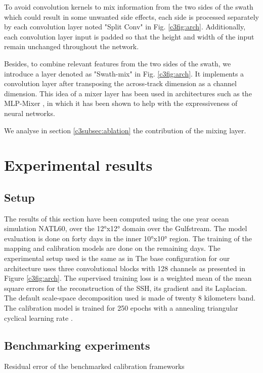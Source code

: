 \begin{bibunit}
To avoid convolution kernels to mix information from the two sides of the swath which could result in some unwanted side effects, each side is processed separately by each convolution layer noted "Split Conv" in Fig. \ref{c3fig:arch}. Additionally, each convolution layer input is padded so that the height and width of the input remain unchanged throughout the network.

Besides, to combine relevant features from the two sides of the swath, we introduce a layer denoted as "Swath-mix" in Fig. \ref{c3fig:arch}. It implements a convolution layer after transposing the across-track dimension as a channel dimension. This idea of a mixer layer has been used in architectures such as the MLP-Mixer \cite{mlpmixer}, in which it has been shown to help with the expressiveness of neural networks.


We analyse in section \ref{c3subsec:ablation} the contribution of the mixing layer.

\section{Experimental results}
\label{c3sec:results}

\subsection*{Setup}
\noindent
The results of this section have been computed using the one year ocean simulation NATL60, over the 12°x12° domain over the Gulfstream. The model evaluation is done on forty days in the inner 10°x10° region. The training of the mapping and calibration models are done on the remaining days.
The experimental setup used is the same as in \cite{osse_data_challenge}
The base configuration for our architecture uses three convolutional blocks with 128 channels as presented in Figure \ref{c3fig:arch}.
The supervised training loss is a weighted mean of the mean square errors for the reconstruction of the SSH, its gradient and its Laplacian.
The default scale-space decomposition used is made of twenty 8 kilometers band.
The calibration model is trained for 250 epochs with a annealing triangular cyclical learning rate \cite{Smith_2017}.

\subsection*{Benchmarking experiments}
\label{c3subsec:main_res}
\noindent

\begin{table}[t]
\begin{center}

\end{center}
\caption{Residual error of the benchmarked calibration frameworks}
\label{c3table:main}
\end{table}


\end{bibunit}
